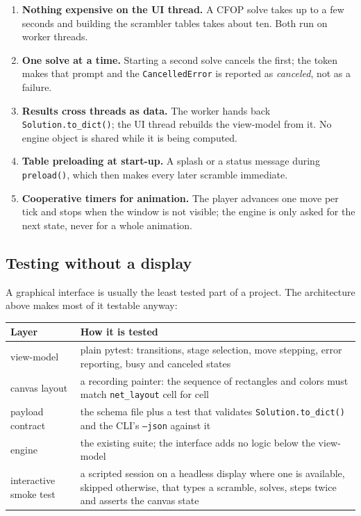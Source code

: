 \begin{enumerate}[leftmargin=1.4em]
  \item \textbf{Nothing expensive on the UI thread.}  A CFOP solve takes up to a few
  seconds and building the scrambler tables takes about ten.  Both run on worker
  threads.
  \item \textbf{One solve at a time.}  Starting a second solve cancels the first;
  the token makes that prompt and the \texttt{CancelledError} is reported as
  \emph{canceled}, not as a failure.
  \item \textbf{Results cross threads as data.}  The worker hands back
  \texttt{Solution.to\_dict()}; the UI thread rebuilds the view-model from it.  No
  engine object is shared while it is being computed.
  \item \textbf{Table preloading at start-up.}  A splash or a status message during
  \texttt{preload()}, which then makes every later scramble immediate.
  \item \textbf{Cooperative timers for animation.}  The player advances one move per
  tick and stops when the window is not visible; the engine is only asked for the
  next state, never for a whole animation.
\end{enumerate}

\subsection{Testing without a display}

A graphical interface is usually the least tested part of a project.  The
architecture above makes most of it testable anyway:

\begin{longtable}{@{}p{4.6cm}p{9.4cm}@{}}
\toprule
Layer & How it is tested \\
\midrule
\endhead
view-model & plain pytest: transitions, stage selection, move stepping, error
reporting, busy and canceled states \\
canvas layout & a recording painter: the sequence of rectangles and colors must
match \texttt{net\_layout} cell for cell \\
payload contract & the schema file plus a test that validates
\texttt{Solution.to\_dict()} and the CLI's \texttt{--json} against it \\
engine & the existing suite; the interface adds no logic below the view-model \\
interactive smoke test & a scripted session on a headless display where one is
available, skipped otherwise, that types a scramble, solves, steps twice and
asserts the canvas state \\
\bottomrule
\end{longtable}

